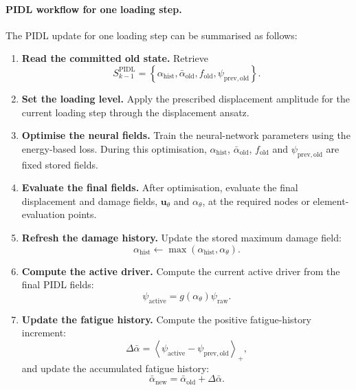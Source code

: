 \paragraph{PIDL workflow for one loading step.}
The PIDL update for one loading step can be summarised as follows:
\begin{enumerate}
    \item \textbf{Read the committed old state.} Retrieve
    \[
    S_{k-1}^{\mathrm{PIDL}}
    =
    \left\{
    \alpha_{\mathrm{hist}},
    \bar{\alpha}_{\mathrm{old}},
    f_{\mathrm{old}},
    \psi_{\mathrm{prev,old}}
    \right\}.
    \]

    \item \textbf{Set the loading level.} Apply the prescribed displacement amplitude for the current loading step through the displacement ansatz.

    \item \textbf{Optimise the neural fields.} Train the neural-network parameters using the energy-based loss. During this optimisation, \(\alpha_{\mathrm{hist}}\), \(\bar{\alpha}_{\mathrm{old}}\), \(f_{\mathrm{old}}\) and \(\psi_{\mathrm{prev,old}}\) are fixed stored fields.

    \item \textbf{Evaluate the final fields.} After optimisation, evaluate the final displacement and damage fields, \(\mathbf{u}_{\theta}\) and \(\alpha_{\theta}\), at the required nodes or element-evaluation points.

    \item \textbf{Refresh the damage history.} Update the stored maximum damage field:
    \[
    \alpha_{\mathrm{hist}}
    \leftarrow
    \max
    \left(
    \alpha_{\mathrm{hist}},
    \alpha_{\theta}
    \right).
    \]

    \item \textbf{Compute the active driver.} Compute the current active driver from the final PIDL fields:
    \[
    \psi_{\mathrm{active}}
    =
    g(\alpha_{\theta})\psi_{\mathrm{raw}} .
    \]

    \item \textbf{Update the fatigue history.} Compute the positive fatigue-history increment:
    \[
    \Delta\bar{\alpha}
    =
    \left\langle
    \psi_{\mathrm{active}}
    -
    \psi_{\mathrm{prev,old}}
    \right\rangle_{+},
    \]
    and update the accumulated fatigue history:
    \[
    \bar{\alpha}_{\mathrm{new}}
    =
    \bar{\alpha}_{\mathrm{old}}
    +
    \Delta\bar{\alpha}.
    \]


\end{enumerate}
